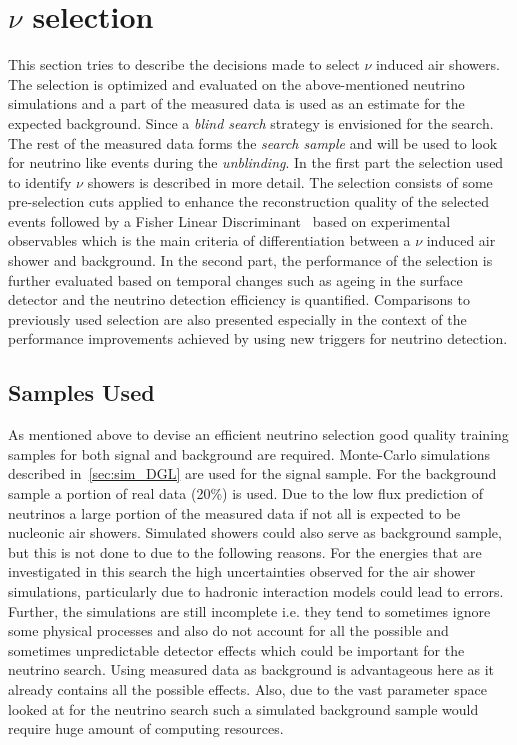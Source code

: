 \section{\texorpdfstring{$\nu$}{} selection}
\label{sec:nu_sel}
This section tries to describe the decisions made to select $\nu$ induced air showers. The selection is optimized and evaluated on the above-mentioned neutrino simulations and a part of the measured data is used as an estimate for the expected background. Since a \textit{blind search} strategy is envisioned for the search. The rest of the measured data forms the \textit{search sample} and will be used to look for neutrino like events during the \textit{unblinding}. 
In the first part the selection used to identify $\nu$ showers is described in more detail. The selection consists of some pre-selection cuts applied to enhance the reconstruction quality of the selected events followed by a Fisher Linear Discriminant~\cite{Fisher_illustrative} based on experimental observables which is the main criteria of differentiation between a $\nu$ induced air shower and background.  
In the second part, the performance of the selection is further evaluated based on temporal changes such as ageing in the surface detector and the neutrino detection efficiency is quantified. Comparisons to previously used selection are also presented especially in the context of the performance improvements achieved by using new triggers for neutrino detection.

\subsection{Samples Used}
\label{subsec:nu_sel_samp}

As mentioned above to devise an efficient neutrino selection good quality training samples for both signal and background are required. Monte-Carlo simulations described in~\ref{sec:sim_DGL} are used for the signal sample. For the background sample a portion of real data (20\%) is used. Due to the low flux prediction of neutrinos a large portion of the measured data if not all is expected to be nucleonic air showers. Simulated showers could also serve as background sample, but this is not done to due to the following reasons. For the energies that are investigated in this search the high uncertainties observed for the air shower simulations, particularly due to hadronic interaction models could lead to errors. Further, the simulations are still incomplete i.e. they tend to sometimes ignore some physical processes and also do not account for all the possible and sometimes unpredictable detector effects which could be important for the neutrino search. Using measured data as background is advantageous here as it already contains all the possible effects. Also, due to the vast parameter space looked at for the neutrino search such a simulated background sample would require huge amount of computing resources. 

